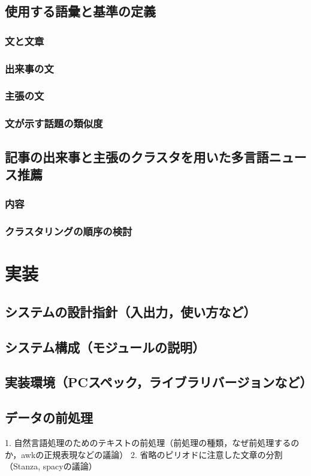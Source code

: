 \documentclass[12pt,a4j]{jreport}
\begin{document}
\section{使用する語彙と基準の定義}
    \subsection{文と文章}
    \subsection{出来事の文}
    \subsection{主張の文}
    \subsection{文が示す話題の類似度}
\section{記事の出来事と主張のクラスタを用いた多言語ニュース推薦}
    \subsection{内容}
    \subsection{クラスタリングの順序の検討}


\chapter{実装}

\section{システムの設計指針（入出力，使い方など）}
\section{システム構成（モジュールの説明）}
\section{実装環境（PCスペック，ライブラリバージョンなど）}
\section{データの前処理}
    1. 自然言語処理のためのテキストの前処理（前処理の種類，なぜ前処理するのか，awkの正規表現などの議論）
    2. 省略のピリオドに注意した文章の分割（Stanza, spacyの議論）
\end{document}
